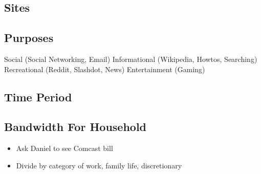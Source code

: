 \documentclass[12pt,letterpaper]{article}
\begin{document}
\subsection{Sites}

\subsection{Purposes}
Social (Social Networking, Email)
Informational (Wikipedia, Howtos, Searching)
Recreational (Reddit, Slashdot, News)
Entertainment (Gaming)

\subsection{Time Period}

\subsection{Bandwidth For Household}
  \begin{itemize}
    \item Ask Daniel to see Comcast bill
    \item Divide by category of work, family life, discretionary
  \end{itemize}
\end{document}
